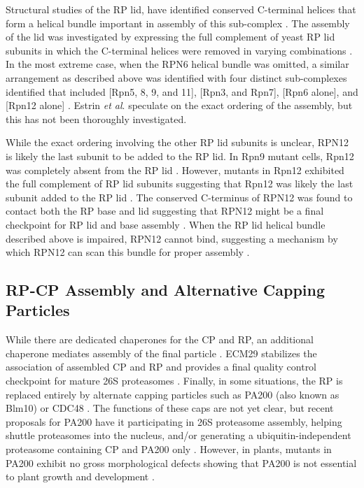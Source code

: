 	Structural studies of the RP lid, have identified conserved C-terminal helices that form a helical bundle important in assembly of this sub-complex \citep{estrin13}. The assembly of the lid was investigated by expressing the full complement of yeast RP lid subunits in which the C-terminal helices were removed in varying combinations \citep{estrin13}. In the most extreme case, when the RPN6 helical bundle was omitted, a similar arrangement as described above was identified with four distinct sub-complexes identified that included [Rpn5, 8, 9, and 11], [Rpn3, and Rpn7], [Rpn6 alone], and [Rpn12 alone] \citep{estrin13}. Estrin \textit{et al}. speculate on the exact ordering of the assembly, but this has not been thoroughly investigated.

	While the exact ordering involving the other RP lid subunits is unclear, RPN12 is likely the last subunit to be added to the RP lid. In Rpn9 mutant cells, Rpn12 was completely absent from the RP lid \citep{fukunaga10}. However, mutants in Rpn12 exhibited the full complement of RP lid subunits suggesting that Rpn12 was likely the last subunit added to the RP lid \citep{tomko11}. The conserved C-terminus of RPN12 was found to contact both the RP base and lid suggesting that RPN12 might be a final checkpoint for RP lid and base assembly \citep{tomko11}. When the RP lid helical bundle described above is impaired, RPN12 cannot bind, suggesting a mechanism by which RPN12 can scan this bundle for proper assembly \citep{estrin13}.
	 
\subsection{RP-CP Assembly and Alternative Capping Particles}
 	While there are dedicated chaperones for the CP and RP, an additional chaperone mediates assembly of the final particle \citep{ramos98}.  ECM29 stabilizes the association of assembled CP and RP and provides a final quality control checkpoint for mature 26S proteasomes \citep{besche14, lehmann10}.  
	Finally, in some situations, the RP is replaced entirely by alternate capping particles such as PA200 (also known as Blm10) or CDC48 \citep{barthelme12, book10, schmidt05}.  The functions of these caps are not yet clear, but recent proposals for PA200 have it participating in 26S proteasome assembly, helping shuttle proteasomes into the nucleus, and/or generating a ubiquitin-independent proteasome containing CP and PA200 only \citep{dange11, sadre-bazzaz10, weberruss13}. However, in plants, mutants in PA200 exhibit no gross morphological defects showing that PA200 is not essential to plant growth and development \citep{book10}.

